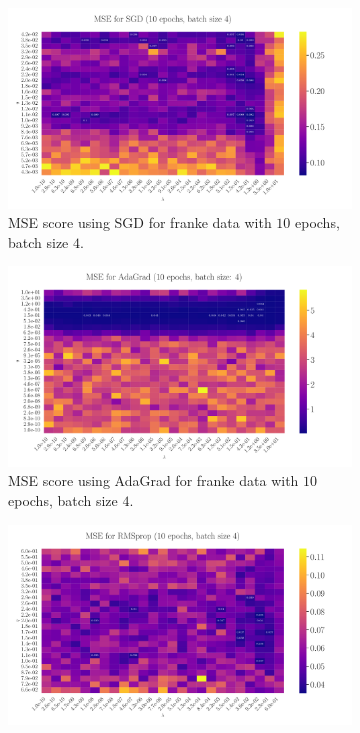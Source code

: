 \documentclass[%
reprint,s
amsmath,amssymb,
aps,
]{revtex4-2}
\begin{document}
\begin{figure}
	\begin{subfigure}{0.41\textwidth}
		\includegraphics[width=\textwidth]{Figures/LinRegSGD_25x25_epoch10_batchS4.pdf}
		\caption{MSE score using SGD for franke data with \(10\) epochs, batch size \(4\).}
		\label{fig:LinReg25x25_epoch10_bacthS50}
	\end{subfigure}
	\hfill
	\begin{subfigure}{0.41\textwidth}
		\includegraphics[width=\textwidth]{Figures/LinRegAdaGrad_25x25_epoch10_batchS4.pdf}
		\caption{MSE score using AdaGrad for franke data with \(10\) epochs, batch size \(4\).}
		\label{fig:LinReg25x25_epoch10_bacthS50_zoomed}
	\end{subfigure}
\hfill\newline
	\begin{subfigure}{0.41\textwidth}
		\includegraphics[width=\textwidth]{Figures/LinRegRMSprop_25x25_epoch10_batchS4.pdf}

\end{subfigure}
\end{figure}
\end{document}
